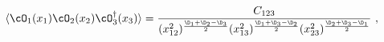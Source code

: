 \begin{equation} 
\label{3pt}
\langle \cO_{1}(x_1) \cO_{2}(x_2) \cO^{\dagger}_{3}(x_3) \rangle  =
\frac{C_{123} }
{(x_{12}^2)^{\frac{\D_1+\D_2 -\D_3}{2}}
 (x_{13}^2)^{\frac{\D_1+\D_3 -\D_2}{2}}
 (x_{23}^2)^{\frac{\D_2+\D_3 -\D_1}{2}}} \ ,
\end{equation}

